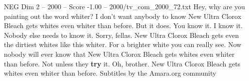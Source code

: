 \begin{textsample}{NEG Dim 2 – 2000 – Score -1.00 – 2000/tv\_com\_2000\_72.txt}  \label{ex:f2_neg_007}
Hey, why are you painting out the word whiter?
I don't want anybody to know New Ultra Clorox Bleach gets whites even whiter than before.
But it does.
You know it.
I know it.
Nobody else needs to know it.
Sorry, fellas.
New Ultra Clorox Bleach gets even the dirtiest whites like this whiter.
For a brighter white you can really see.
Now nobody will ever know that New Ultra Clorox Bleach gets whites even whiter than before.
Not unless they \textbf{try} it.
Oh, brother.
New Ultra Clorox Bleach gets whites even whiter than before.
Subtitles by the Amara.org community

\end{textsample}
